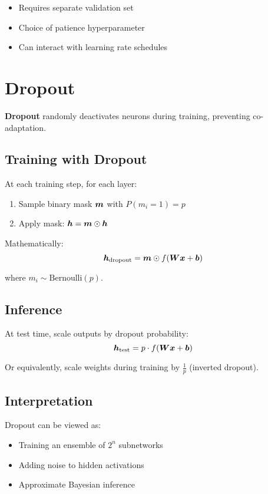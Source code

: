 \begin{itemize}
    \item Requires separate validation set
    \item Choice of patience hyperparameter
    \item Can interact with learning rate schedules
\end{itemize}

\section{Dropout}
\label{sec:dropout}

\textbf{Dropout} randomly deactivates neurons during training, preventing co-adaptation.

\subsection{Training with Dropout}

At each training step, for each layer:
\begin{enumerate}
    \item Sample binary mask $\boldsymbol{m}$ with $P(m_i = 1) = p$
    \item Apply mask: $\boldsymbol{h} = \boldsymbol{m} \odot \boldsymbol{h}$
\end{enumerate}

Mathematically:
\begin{equation}
\boldsymbol{h}_{\text{dropout}} = \boldsymbol{m} \odot f(\boldsymbol{W}\boldsymbol{x} + \boldsymbol{b})
\end{equation}

where $m_i \sim \text{Bernoulli}(p)$.

\subsection{Inference}

At test time, scale outputs by dropout probability:
\begin{equation}
\boldsymbol{h}_{\text{test}} = p \cdot f(\boldsymbol{W}\boldsymbol{x} + \boldsymbol{b})
\end{equation}

Or equivalently, scale weights during training by $\frac{1}{p}$ (inverted dropout).

\subsection{Interpretation}

Dropout can be viewed as:
\begin{itemize}
    \item Training an ensemble of $2^n$ subnetworks
    \item Adding noise to hidden activations
    \item Approximate Bayesian inference
\end{itemize}

